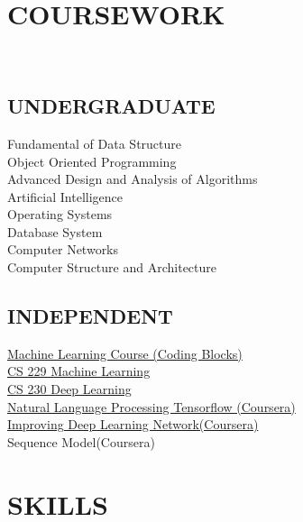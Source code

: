 \documentclass[a4paper]{deedy-resume-openfont}
\begin{document}
\begin{minipage}[t]{0.33\textwidth}

\section{COURSEWORK}
\quad \\
\subsection{UNDERGRADUATE}

Fundamental of Data Structure \\
Object Oriented Programming \\ 
Advanced Design and Analysis of Algorithms \\ 
Artificial Intelligence \\ 
Operating Systems \\ 
Database System \\ 
Computer Networks \\ 
Computer Structure and Architecture \\ 

\sectionsep

\subsection{INDEPENDENT}

\href{https://online.codingblocks.com/app/certificates/CBOL-26635-2848}{Machine Learning Course (Coding Blocks)} \\
\href{http://cs229.stanford.edu/}{CS 229 Machine Learning} \\
\href{https://cs230.stanford.edu/}{CS 230 Deep Learning} \\
\href{https://coursera.org/share/0d85004d7396f79556aa1a92de8a3ab5}{Natural Language Processing Tensorflow (Coursera)} \\
\href{https://coursera.org/share/bf38126b8c3094913923da5075b257d5}{Improving Deep Learning Network(Coursera)} \\
Sequence Model(Coursera) \\



\section{SKILLS}

\end{minipage}
\end{document}
